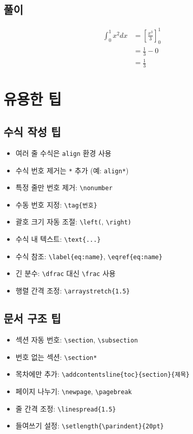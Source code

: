 \documentclass[12pt,a4paper]{article}
\begin{document}
\subsection{풀이}
\begin{align}
    \int_0^1 x^2 dx &= \left[ \frac{x^3}{3} \right]_0^1 \\
                     &= \frac{1}{3} - 0 \\
                     &= \frac{1}{3}
\end{align}

\section{유용한 팁}

\subsection{수식 작성 팁}
\begin{itemize}
    \item 여러 줄 수식은 \texttt{align} 환경 사용
    \item 수식 번호 제거는 \texttt{*} 추가 (예: \texttt{align*})
    \item 특정 줄만 번호 제거: \texttt{\textbackslash nonumber}
    \item 수동 번호 지정: \texttt{\textbackslash tag\{번호\}}
    \item 괄호 크기 자동 조절: \texttt{\textbackslash left(}, \texttt{\textbackslash right)}
    \item 수식 내 텍스트: \texttt{\textbackslash text\{...\}}
    \item 수식 참조: \texttt{\textbackslash label\{eq:name\}}, \texttt{\textbackslash eqref\{eq:name\}}
    \item 긴 분수: \texttt{\textbackslash dfrac} 대신 \texttt{\textbackslash frac} 사용
    \item 행렬 간격 조정: \texttt{\textbackslash arraystretch\{1.5\}}
\end{itemize}

\subsection{문서 구조 팁}
\begin{itemize}
    \item 섹션 자동 번호: \texttt{\textbackslash section}, \texttt{\textbackslash subsection}
    \item 번호 없는 섹션: \texttt{\textbackslash section*}
    \item 목차에만 추가: \texttt{\textbackslash addcontentsline\{toc\}\{section\}\{제목\}}
    \item 페이지 나누기: \texttt{\textbackslash newpage}, \texttt{\textbackslash pagebreak}
    \item 줄 간격 조정: \texttt{\textbackslash linespread\{1.5\}}
    \item 들여쓰기 설정: \texttt{\textbackslash setlength\{\textbackslash parindent\}\{20pt\}}
\end{itemize}
\end{document}
